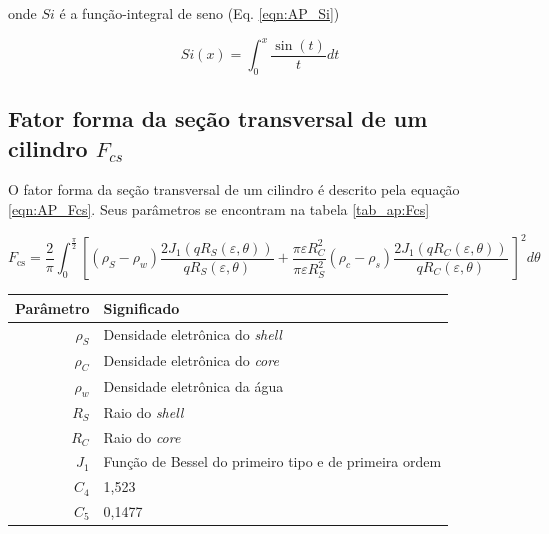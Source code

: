 \begin{apendicesenv}
\noindent onde \(Si\) é a função-integral de seno (Eq. \ref{eqn:AP_Si})

\begin{equation}
Si(x) = \int_0^x \frac{\sin (t)}{t}dt
\label{eqn:AP_Si}
\end{equation}

\subsection{Fator forma da seção transversal de um cilindro \(F_{cs}\)}

O fator forma da seção transversal de um cilindro é descrito pela equação \ref{eqn:AP_Fcs}. Seus parâmetros se encontram na tabela \ref{tab_ap:Fcs}

\begin{equation}
F_{\text{cs}} = \frac{2}{\pi}\int_{0}^{\frac{\pi}{2}}%
%
\left[ \left(\rho_{S} - \rho_{w} \right) \frac{2J_1 \left( qR_{S}\left( \varepsilon,\theta \right) \right)}{qR_{S}\left( \varepsilon,\theta \right)} %
%
+  %
%
\frac{\pi\varepsilon R_C^2}{\pi\varepsilon R_S^2}\left( \rho_c - \rho_s \right)	%
%
\frac{2J_1\left( qR_{C}\left( \varepsilon,\theta \right) \right)}{qR_{C}\left( \varepsilon,\theta \right)}\  \right]^2 d\theta
\label{eqn:AP_Fcs}
\end{equation}


\begin{table}
    {\begin{tabular}{r l}
            \toprule
            Parâmetro 			& Significado \\
            \midrule
            \(\rho_S\)			&  Densidade eletrônica do \emph{shell} \\
            \(\rho_C\)			&  Densidade eletrônica do \emph{core}  \\
            \(\rho_w\)			&  Densidade eletrônica da água			\\
            \(R_S\)			& Raio do \emph{shell} 						\\
            \(R_C\)			& Raio do \emph{core}						\\
            \(J_1\)			&  Função de Bessel do primeiro tipo e de primeira ordem\\
            \(C_4\)			&  1,523	\\
            \(C_5\)			&  0,1477 	\\						
            \bottomrule
        \end{tabular}}%
    {}%
\end{table}


\end{apendicesenv}
